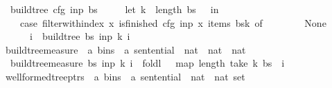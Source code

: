 \begin{isabellebody}
\ \ {\isachardoublequoteopen}build{\isacharunderscore}{\kern0pt}tree\ cfg\ inp\ bs\ {\isasymequiv}\isanewline
\ \ \ \ let\ k\ {\isacharequal}{\kern0pt}\ length\ bs\ {\isacharminus}{\kern0pt}\ {}\ in\ {\isacharparenleft}{\kern0pt}\isanewline
\ \ \ \ case\ filter{\isacharunderscore}{\kern0pt}with{\isacharunderscore}{\kern0pt}index\ {\isacharparenleft}{\kern0pt}{\isasymlambda}x{\isachardot}{\kern0pt}\ is{\isacharunderscore}{\kern0pt}finished\ cfg\ inp\ x{\isacharparenright}{\kern0pt}\ {\isacharparenleft}{\kern0pt}items\ {\isacharparenleft}{\kern0pt}bs{\isacharbang}{\kern0pt}k{\isacharparenright}{\kern0pt}{\isacharparenright}{\kern0pt}\ of\isanewline
\ \ \ \ \ \ {\isacharbrackleft}{\kern0pt}{\isacharbrackright}{\kern0pt}\ {\isasymRightarrow}\ None\isanewline
\ \ \ \ {\isacharbar}{\kern0pt}\ {\isacharparenleft}{\kern0pt}{\isacharunderscore}{\kern0pt}{\isacharcomma}{\kern0pt}\ i{\isacharparenright}{\kern0pt}{\isacharhash}{\kern0pt}{\isacharunderscore}{\kern0pt}\ {\isasymRightarrow}\ build{\isacharunderscore}{\kern0pt}tree{\isacharprime}{\kern0pt}\ bs\ inp\ k\ i{\isacharparenright}{\kern0pt}{\isachardoublequoteclose}\isanewline
\isanewline
{}\isamarkupfalse%
\ build{\isacharunderscore}{\kern0pt}tree{\isacharprime}{\kern0pt}{\isacharunderscore}{\kern0pt}measure\ {\isacharcolon}{\kern0pt}{\isacharcolon}{\kern0pt}\ {\isachardoublequoteopen}{\isacharparenleft}{\kern0pt}{\isacharprime}{\kern0pt}a\ bins\ {\isasymtimes}\ {\isacharprime}{\kern0pt}a\ sentential\ {\isasymtimes}\ nat\ {\isasymtimes}\ nat{\isacharparenright}{\kern0pt}\ {\isasymRightarrow}\ nat{\isachardoublequoteclose}\ \isanewline
\ \ {\isachardoublequoteopen}build{\isacharunderscore}{\kern0pt}tree{\isacharprime}{\kern0pt}{\isacharunderscore}{\kern0pt}measure\ {\isacharparenleft}{\kern0pt}bs{\isacharcomma}{\kern0pt}\ inp{\isacharcomma}{\kern0pt}\ k{\isacharcomma}{\kern0pt}\ i{\isacharparenright}{\kern0pt}\ {\isacharequal}{\kern0pt}\ foldl\ {\isacharparenleft}{\kern0pt}{\isacharplus}{\kern0pt}{\isacharparenright}{\kern0pt}\ {}\ {\isacharparenleft}{\kern0pt}map\ length\ {\isacharparenleft}{\kern0pt}take\ k\ bs{\isacharparenright}{\kern0pt}{\isacharparenright}{\kern0pt}\ {\isacharplus}{\kern0pt}\ i{\isachardoublequoteclose}\isanewline
\isanewline
{}\isamarkupfalse%
\ wellformed{\isacharunderscore}{\kern0pt}tree{\isacharunderscore}{\kern0pt}ptrs\ {\isacharcolon}{\kern0pt}{\isacharcolon}{\kern0pt}\ {\isachardoublequoteopen}{\isacharparenleft}{\kern0pt}{\isacharprime}{\kern0pt}a\ bins\ {\isasymtimes}\ {\isacharprime}{\kern0pt}a\ sentential\ {\isasymtimes}\ nat\ {\isasymtimes}\ nat{\isacharparenright}{\kern0pt}\ set{\isachardoublequoteclose}\ \isanewline

\end{isabellebody}
